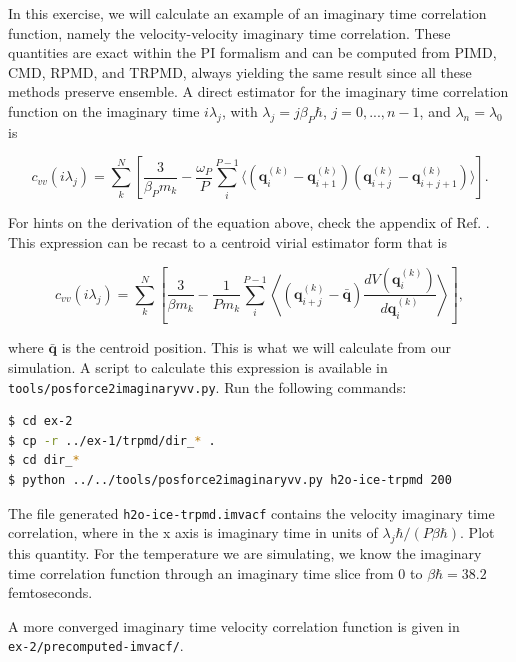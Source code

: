 \documentclass{article}
\begin{document}
\begin{Exercise}[label={imaginarytime},title={Velocity imaginary time correlation function}]

In this exercise, we will calculate an example of an imaginary time correlation function, namely the velocity-velocity imaginary time correlation. These quantities are exact within the PI formalism and can be computed from PIMD, CMD, RPMD, and TRPMD, always yielding the same result since all these methods preserve ensemble. A direct estimator for the imaginary time correlation function on the imaginary time $i \lambda_j$, with $\lambda_j=j\beta_P\hbar$, $j=0,...,n-1$, and $\lambda_n=\lambda_0$ is

\begin{equation}
c_{vv}(i \lambda_j ) = \sum_k^N \left[ \frac{3}{\beta_P m_k} - \frac{\omega_P}{P} \sum_i^{P-1} \langle (\mathbf{q}_i^{(k)}-\mathbf{q}_{i+1}^{(k)})(\mathbf{q}_{i+j}^{(k)}-\mathbf{q}_{i+j+1}^{(k)}) \rangle\right].
\end{equation}

For hints on the derivation of the equation above, check the appendix of Ref. \cite{habe+07jcp}. This expression can be recast to a centroid virial estimator form that is


\begin{equation}
c_{vv}(i \lambda_j ) = \sum_k^N \left[ \frac{3}{\beta m_k} - \frac{1}{P m_k} \sum_i^{P-1} \left\langle (\mathbf{q}_{i+j}^{(k)}-\bar{\mathbf{q}})  \frac{dV(\mathbf{q}_i^{(k)})}{d \mathbf{q}_i^{(k)}} \right\rangle\right],
\end{equation}

\noindent where $\bar{\mathbf{q}}$ is the centroid position. This is what we will calculate from our simulation. A script to calculate this expression is available in \texttt{tools/posforce2imaginaryvv.py}. Run the following commands:

\begin{lstlisting}[language=Bash,emph={\$}]
$ cd ex-2
$ cp -r ../ex-1/trpmd/dir_* .
$ cd dir_*
$ python ../../tools/posforce2imaginaryvv.py h2o-ice-trpmd 200
\end{lstlisting}

The file generated \texttt{h2o-ice-trpmd.imvacf} contains the velocity imaginary time correlation, where in the x axis is imaginary time in units of $\lambda_j \hbar/(P \beta \hbar)$. Plot this quantity. For the temperature we are simulating, we know the imaginary time correlation function through an imaginary time slice from $0$ to $\beta \hbar = 38.2$ femtoseconds. 

A more converged imaginary time velocity correlation function is given in \\
\texttt{ex-2/precomputed-imvacf/}.

\end{Exercise}
\end{document}
